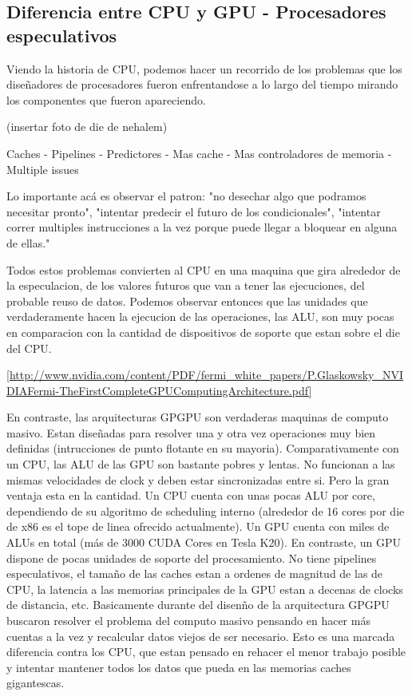 \subsection{Diferencia entre CPU y GPU - Procesadores especulativos}
Viendo la historia de CPU, podemos hacer un recorrido de los problemas que los dise\~nadores de procesadores
fueron enfrentandose a lo largo del tiempo mirando los componentes que fueron apareciendo.

(insertar foto de die de nehalem)

Caches - Pipelines - Predictores - Mas cache - Mas controladores de memoria - Multiple issues

Lo importante ac\'a es observar el patron: "no desechar algo que podramos necesitar pronto",
"intentar predecir el futuro de los condicionales", "intentar correr multiples instrucciones a la vez
porque puede llegar a bloquear en alguna de ellas."

Todos estos problemas convierten al CPU en una maquina que gira alrededor de la especulacion,
de los valores futuros que van a tener las ejecuciones, del probable reuso de datos.
Podemos observar entonces que las unidades que verdaderamente hacen la ejecucion de las operaciones,
las ALU, son muy pocas en comparacion con la cantidad de dispositivos de soporte que estan
sobre el die del CPU.

\ref{http://www.nvidia.com/content/PDF/fermi_white_papers/P.Glaskowsky_NVIDIAFermi-TheFirstCompleteGPUComputingArchitecture.pdf}

En contraste, las arquitecturas GPGPU son verdaderas maquinas de computo masivo. Estan dise\~nadas para
resolver una y otra vez operaciones muy bien definidas (intrucciones de punto flotante en su mayoria).
Comparativamente con un CPU, las ALU de las GPU son bastante pobres y lentas. No funcionan a las mismas
velocidades de clock y deben estar sincronizadas entre si. Pero la gran ventaja esta en la cantidad.
Un CPU cuenta con unas pocas ALU por core, dependiendo de su algoritmo de scheduling interno
(alrededor de 16 cores por die de x86 es el tope de linea ofrecido actualmente). Un GPU cuenta con miles de ALUs en total
(m\'as de 3000 CUDA Cores en Tesla K20).
En contraste, un GPU dispone de pocas unidades de soporte del procesamiento. No tiene pipelines especulativos, el tama\~no de las caches
estan a ordenes de magnitud de las de CPU, la latencia a las memorias principales de la GPU estan a
decenas de clocks de distancia, etc. Basicamente durante del disen\~no de la arquitectura GPGPU
buscaron resolver el problema del computo masivo pensando en hacer m\'as cuentas a la vez y
recalcular datos viejos de ser necesario. Esto es una marcada diferencia contra los CPU, que estan
pensado en rehacer el menor trabajo posible y intentar mantener todos los datos que pueda en
las memorias caches gigantescas.

